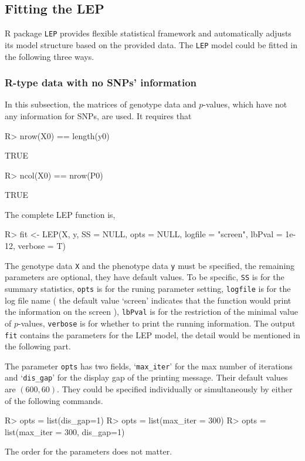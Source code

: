 \documentclass[11pt]{article}
\begin{document}
\subsection{Fitting the LEP}\label{fitting}

R package \texttt{LEP} provides flexible statistical framework
and automatically adjusts its model structure based on the provided data.
The \texttt{LEP} model could be fitted in the following three ways.


\subsubsection{R-type data with no SNPs' information}
In this subsection, the matrices of genotype data and $p$-values, which have not any information for SNPs, are used. It requires that
\begin{Schunk}
\begin{Sinput}
R> nrow(X0) == length(y0)
\end{Sinput}
\begin{Soutput}
[1] TRUE
\end{Soutput}
\begin{Sinput}
R> ncol(X0) == nrow(P0)
\end{Sinput}
\begin{Soutput}
[1] TRUE
\end{Soutput}
\end{Schunk}

The complete LEP function is,
\begin{Schunk}
\begin{Sinput}
R> fit <- LEP(X, y, SS = NULL, opts = NULL, logfile = "screen", lbPval = 1e-12, verbose = T)
\end{Sinput}
\end{Schunk}

The genotype data \texttt{X} and the phenotype data \texttt{y} must be specified, the remaining parameters are optional, they have default values. To be specific, \texttt{SS} is for the summary statistics, \texttt{opts} is for the runing parameter setting, \texttt{logfile} is for the log file name ( the default value `screen' indicates that the function would print the information on the screen ), \texttt{lbPval} is for the restriction of the minimal value of $p$-values, \texttt{verbose} is for whether to print the running information. The output \texttt{fit} contains the parameters for the LEP model, the detail would be mentioned in the following part.

The parameter \texttt{opts} has two fields, `\texttt{max\_iter}' for the max number of iterations and `\texttt{dis\_gap}' for the display gap of the printing message. Their default values are $(600,60)$. They could be specified individually or simultaneously by either of the following commands.
\begin{Schunk}
\begin{Sinput}
R> opts = list(dis_gap=1)
R> opts = list(max_iter = 300)
R> opts = list(max_iter = 300, dis_gap=1)
\end{Sinput}
\end{Schunk}
The order for the parameters does not matter.
\end{document}
